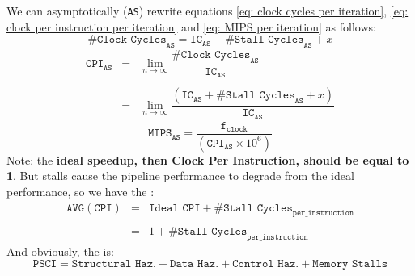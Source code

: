 \noindent
We can asymptotically (\texttt{AS}) rewrite equations \ref{eq: clock cycles per iteration}, \ref{eq: clock per instruction per iteration} and \ref{eq: MIPS per iteration} as follows:
\begin{equation}
    \texttt{\# Clock Cycles}_{\texttt{AS}} = \texttt{IC}_{\texttt{AS}} + \texttt{\# Stall Cycles}_{\texttt{AS}} + x
\end{equation}
\vspace{1em}
\begin{equation}
    \begin{array}{rcl}
        \texttt{CPI}_{\texttt{AS}} &=& \lim_{n \rightarrow \infty} \dfrac{
            \texttt{\# Clock Cycles}_{\texttt{AS}}
        }{
            \texttt{IC}_{\texttt{AS}}
        } \\ \\
        &=& \lim_{n \rightarrow \infty} \dfrac{
            \left(
                \texttt{IC}_{\texttt{AS}} + \texttt{\# Stall Cycles}_{\texttt{AS}} + x
            \right)
        }{
            \texttt{IC}_{\texttt{AS}}
        }
    \end{array}
\end{equation}
\vspace{1em}
\begin{equation}
    \texttt{MIPS}_{\texttt{AS}} = \dfrac{
        \texttt{f}_{\texttt{clock}}
    }{
        \left(\texttt{CPI}_{\texttt{AS}} \times 10^{6}\right)
    }
\end{equation}
Note: the \textbf{ideal speedup, then Clock Per Instruction, should be equal to 1}. But stalls cause the pipeline performance to degrade from the ideal performance, so we have the :
\begin{equation}
    \begin{array}{rcl}
        \texttt{AVG}\left(\texttt{CPI}\right) &=& \texttt{Ideal CPI} + \texttt{\# Stall Cycles}_{\texttt{per\_instruction}} \\ \\
        &=& 1 + \texttt{\# Stall Cycles}_{\texttt{per\_instruction}}
    \end{array}
\end{equation}
And obviously, the  is:
\begin{equation}
    \texttt{PSCI} = \texttt{Structural Haz.} + \texttt{Data Haz.} + \texttt{Control Haz.} + \texttt{Memory Stalls}
\end{equation}